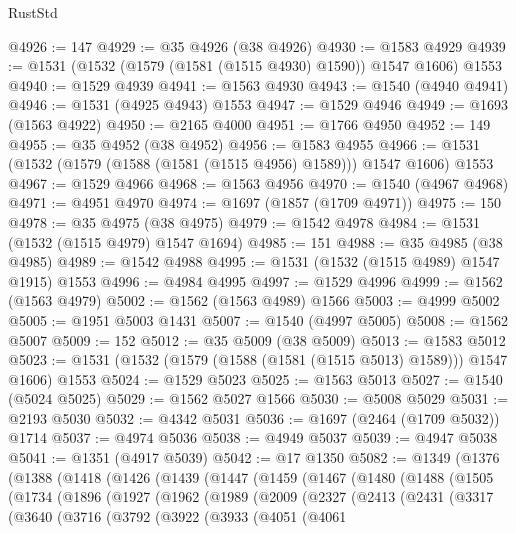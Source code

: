 \begin{lexlean}{RustStd}
\begin{coremodule}
@4926 := 147
@4929 := @35 @4926 (@38 @4926)
@4930 := @1583 @4929
@4939 := @1531 (@1532 (@1579 (@1581 (@1515 @4930) @1590)) @1547 @1606) @1553
@4940 := @1529 @4939
@4941 := @1563 @4930
@4943 := @1540 (@4940 @4941)
@4946 := @1531 (@4925 @4943) @1553
@4947 := @1529 @4946
@4949 := @1693 (@1563 @4922)
@4950 := @2165 @4000
@4951 := @1766 @4950
@4952 := 149
@4955 := @35 @4952 (@38 @4952)
@4956 := @1583 @4955
@4966 := @1531 (@1532 (@1579 (@1588 (@1581 (@1515 @4956) @1589))) @1547 @1606) @1553
@4967 := @1529 @4966
@4968 := @1563 @4956
@4970 := @1540 (@4967 @4968)
@4971 := @4951 @4970
@4974 := @1697 (@1857 (@1709 @4971))
@4975 := 150
@4978 := @35 @4975 (@38 @4975)
@4979 := @1542 @4978
@4984 := @1531 (@1532 (@1515 @4979) @1547 @1694)
@4985 := 151
@4988 := @35 @4985 (@38 @4985)
@4989 := @1542 @4988
@4995 := @1531 (@1532 (@1515 @4989) @1547 @1915) @1553
@4996 := @4984 @4995
@4997 := @1529 @4996
@4999 := @1562 (@1563 @4979)
@5002 := @1562 (@1563 @4989) @1566
@5003 := @4999 @5002
@5005 := @1951 @5003 @1431
@5007 := @1540 (@4997 @5005)
@5008 := @1562 @5007
@5009 := 152
@5012 := @35 @5009 (@38 @5009)
@5013 := @1583 @5012
@5023 := @1531 (@1532 (@1579 (@1588 (@1581 (@1515 @5013) @1589))) @1547 @1606) @1553
@5024 := @1529 @5023
@5025 := @1563 @5013
@5027 := @1540 (@5024 @5025)
@5029 := @1562 @5027 @1566
@5030 := @5008 @5029
@5031 := @2193 @5030
@5032 := @4342 @5031
@5036 := @1697 (@2464 (@1709 @5032)) @1714
@5037 := @4974 @5036
@5038 := @4949 @5037
@5039 := @4947 @5038
@5041 := @1351 (@4917 @5039)
@5042 := @17 @1350
@5082 := @1349
    (@1376
      (@1388
        (@1418
          (@1426
            (@1439
              (@1447
                (@1459
                  (@1467
                    (@1480
                      (@1488
                        (@1505
                          (@1734
                            (@1896
                              (@1927
                                (@1962
                                  (@1989
                                    (@2009
                                      (@2327
                                        (@2413
                                          (@2431
                                            (@3317
                                              (@3640
                                                (@3716
                                                  (@3792
                                                    (@3922
                                                      (@3933
                                                        (@4051
                                                          (@4061

\end{coremodule}
\end{lexlean}
